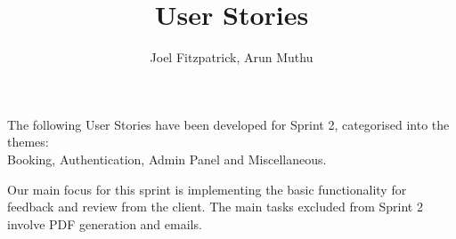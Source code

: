 \documentclass[a4paper, 10pt]{article}
\title{User Stories}
\author{Joel Fitzpatrick, Arun Muthu}
\begin{document}
\setlength{\headsep}{0pt}

\maketitle

\noindent
The following User Stories have been developed for Sprint 2, categorised into the themes: \\
Booking, Authentication, Admin Panel and Miscellaneous.\vspace{\baselineskip}

\noindent
Our main focus for this sprint is implementing the basic functionality for feedback and review from the client. 
The main tasks excluded from Sprint 2 involve PDF generation and emails.

\vspace*{1em}
\end{document}
